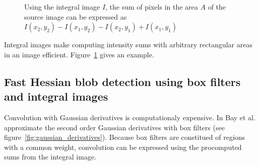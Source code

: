 \begin{figure}
    \centering
    \caption{
        Using the integral image $I$, the sum of pixels in the area $A$ of the source image can be expressed as
        $I(x_2,y_2) -  I(x_1,y_2) - I(x_2,y_1) + I(x_1,y_1)$
        \label{fig:integral_images}
    }
\end{figure}

Integral images make computing intensity sums with arbitrary rectangular areas in an image efficient. Figure~\ref{fig:integral_images} gives an example.

\subsection{Fast Hessian blob detection using box filters and integral images}

Convolution with Gaussian derivatives is computationaly expensive. In \cite{Bay06surf:speeded} Bay et al. approximate the second order Gaussian derivatives with box filters (see figure~\ref{fig:gaussian_derivatives}). Because box filters are constitued of regions with a common weight, convolution can be expressed using the procomputed sums from the integral image.


